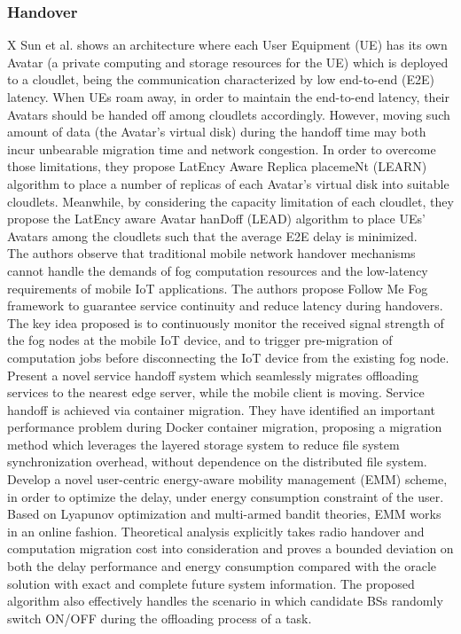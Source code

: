\subsubsection{Handover}

\noindent\tab X Sun et al. \cite{sun2017avaptive} shows an architecture where each User Equipment (UE) has its own Avatar (a private computing and storage resources for the UE) which is deployed to a cloudlet, being the communication characterized by low end-to-end (E2E) latency. When UEs roam away, in order to maintain the end-to-end latency, their Avatars should be handed off among cloudlets accordingly. However, moving such amount of data (the Avatar’s virtual disk) during the handoff time may both incur unbearable migration time and network congestion. In order to overcome those limitations, they propose LatEncy Aware Replica placemeNt (LEARN) algorithm to place a number of replicas of each Avatar’s virtual disk into suitable cloudlets. Meanwhile, by considering the capacity limitation of each cloudlet, they propose the LatEncy aware Avatar hanDoff (LEAD) algorithm to place
UEs’ Avatars among the cloudlets such that the average E2E delay is minimized.\\ %

\cite{bao2017follow}
The authors observe that traditional mobile network handover mechanisms cannot handle the demands of fog computation resources and the low-latency requirements of mobile IoT applications. The authors propose Follow Me Fog framework to guarantee service continuity and reduce latency during handovers. The key idea proposed is to continuously monitor the received signal strength of the fog nodes at the mobile IoT device, and to trigger pre-migration of computation jobs before disconnecting the IoT device from the existing fog node.\\

\cite{ma2017efficient}
Present a novel service handoff system which seamlessly migrates offloading services to the nearest edge server, while the mobile client is moving. Service handoff is achieved via container migration. They have identified an important performance problem during Docker container migration, proposing a migration method which leverages the layered storage system to reduce file system synchronization overhead, without dependence on the distributed file system.\\

\cite{sun2017emm}
Develop a novel user-centric energy-aware mobility management (EMM) scheme, in order to optimize the delay, under energy consumption constraint of the user. Based on Lyapunov optimization and multi-armed bandit theories, EMM works in an online fashion. Theoretical analysis explicitly takes radio handover and computation migration cost into consideration and proves a bounded deviation on both the delay performance and energy consumption compared with the oracle solution with exact and complete future system information. The proposed algorithm also effectively handles the scenario in which candidate BSs randomly switch ON/OFF during the offloading process of a task.\\

